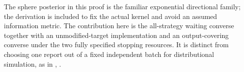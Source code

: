 The sphere posterior in this proof is the familiar exponential directional family; the derivation is included to fix the actual kernel and avoid an assumed information metric. The contribution here is the all-strategy waiting converse together with an unmodified-target implementation and an output-covering converse under the two fully specified stopping resources. It is distinct from choosing one report out of a fixed independent batch for distributional simulation, as in \cite{BP23}, \cite{SPJ26}.
